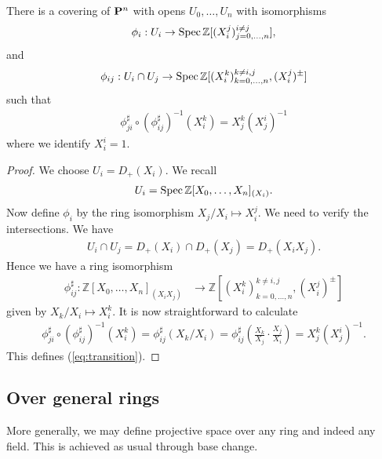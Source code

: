 \documentclass{article}
\begin{document}
\begin{lemma}\label{lem:affine_cover}
  There is a covering of $\mathbf{P}^{n}_{}$ with opens
  $U_0,\ldots,U_n$ with isomorphisms
  \begin{align*}
    \phi_i : U_i \to \operatorname{Spec}\mathbb{Z}[(X_i^j)_{j=0,\ldots,n}^{i\neq j}],
  \end{align*}
  and
  \begin{align}\label{eq:transition}
    \phi_{ij} : U_i \cap U_j \to \operatorname{Spec}\mathbb{Z}[(X_i^k)_{k=0,\ldots,n}^{k\neq i,j}, (X_i^j)^\pm]
  \end{align}
  such that
  \begin{align*}
    \phi^\sharp_{ji}\circ{\left(\phi^\sharp_{ij}\right)}^{-1} (X_i^k) = X_j^k{(X^i_j)}^{-1}
  \end{align*}
  where we identify $X_i^i = 1$.
  \begin{proof}
    We choose $U_i = D_+(X_i)$. We recall
    \begin{align*}
      U_i = \operatorname{Spec}\mathbb{Z}[X_0,\ldots,X_n]_{(X_i)}.
    \end{align*}
    Now define $\phi_i$ by the ring isomorphism
    $X_j/X_i \mapsto X_i^j$. We need to verify the intersections.
    We have
    \begin{align*}
      U_i \cap U_j
      = D_+(X_i)\cap D_+(X_j)
      = D_+(X_i X_j).
    \end{align*}
    Hence we have a ring isomorphism
    \begin{align*}
      \phi_{ij}^\sharp : \mathbb{Z}[X_0,\ldots,X_n]_{(X_iX_j)}
      &\to \mathbb{Z}[(X_i^k)_{k=0,\ldots,n}^{k\neq i,j}, (X_i^j)^\pm]
    \end{align*}
    given by
    $X_k/X_i \mapsto X_i^k$. It is now straightforward to calculate
    \begin{align*}
      \phi^\sharp_{ji}\circ{\left(\phi^\sharp_{ij}\right)}^{-1}(X^k_i)
      = \phi_{ij}^\sharp (X_k/X_i)
      = \phi_{ij}^\sharp \left({\frac{X_k}{X_j}\cdot\frac{X_j}{X_i}}\right)
      = X^k_j {(X_j^i)}^{-1}.
    \end{align*}
    This defines (\ref{eq:transition}).
  \end{proof}
\end{lemma}

\subsection{Over general rings}

More generally, we may define projective space over any ring and
indeed any field. This is achieved as usual through base change.
\end{document}
